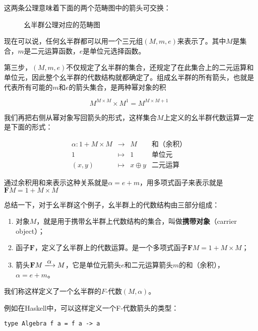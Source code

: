 \documentclass{article}
\begin{document}
\begin{example}
这两条公理意味着下面的两个范畴图中的箭头可交换：

\begin{figure}[htbp]
\centering
{}
\quad
{}
\caption{幺半群公理对应的范畴图}
\end{figure}

现在可以说，任何幺半群都可以用一个三元组$(M, m, e)$来表示了。其中$M$是集合，$m$是二元运算函数，$e$是单位元选择函数。

第三步，$(M, m, e)$不仅规定了幺半群的集合，还规定了在此集合上的二元运算和单位元，因此整个幺半群的代数结构就都确定了。组成幺半群的所有箭头，也就是代表所有可能的$m$和$e$的箭头集合，是两种幂对象的积

\[
M^{M \times M} \times M^1 = M^{M \times M + 1}
\]

我们再把右侧从幂对象写回箭头的形式，这样集合$M$上定义的幺半群代数运算一定是下面的形式：

\[
\begin{array}{rcll}
\alpha : 1 + M \times M & \longrightarrow & M & \text{和（余积）}\\
1 & \longmapsto & 1 & \text{单位元}  \\
(x, y) & \longmapsto & x \oplus y & \text{二元运算}
\end{array}
\]

通过余积用和来表示这种关系就是$\alpha = e + m$，用多项式函子来表示就是$\mathbf{F} M = 1 + M \times M$

总结一下，对于幺半群这个例子，幺半群上的代数结构由三部分组成：

\begin{enumerate}
  \item 对象$M$，就是用于携带幺半群上代数结构的集合，叫做\textbf{携带对象}（carrier object）；
  \item 函子$\mathbf{F}$，定义了幺半群上的代数运算。是一个多项式函子$\mathbf{F} M = 1 + M \times M$；
  \item 箭头$\mathbf{F} M \arrowto{\alpha} M$，它是单位元箭头$e$和二元运算箭头$m$的和（余积），$\alpha = e + m$。
\end{enumerate}

我们称这样定义了一个幺半群的$F$-代数$(M, \alpha)$。

例如在Haskell中，可以这样定义一个F-代数箭头的类型：

\begin{lstlisting}
type Algebra f a = f a -> a
\end{lstlisting}


\end{example}
\end{document}
